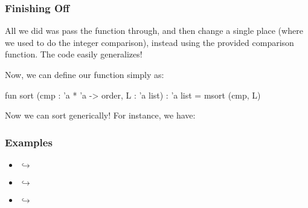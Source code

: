 \documentclass[aspectratio=169, handout]{beamer}
\begin{document}
\begin{frame}[fragile]
  \frametitle{Finishing Off }


  All we did was pass the  function through, and then change a
  single place (where we used to do the integer comparison), instead using
  the provided comparison function. The code easily generalizes!

  \vspace{\fill}

  Now, we can define our  function simply as:

  \pause
  \vspace{\fill}

  \begin{codeblock}
    fun sort (cmp : 'a * 'a -> order, L : 'a list) : 'a list = msort (cmp, L)
  \end{codeblock}

  \pause
  \vspace{\fill}

  Now we can sort generically! For instance, we have:
\end{frame}

\begin{frame}[fragile]
  \frametitle{ Examples}

  \begin{itemize}
    \item {} $\hookrightarrow$ \code{[1, 2, 3]}
    \item {} $\hookrightarrow$ \code{["a", "b", "ab"]}
    \item {} $\hookrightarrow$ \code{[3, 2, 1]}
  \end{itemize}
\end{frame}



\thankyou
\end{document}
